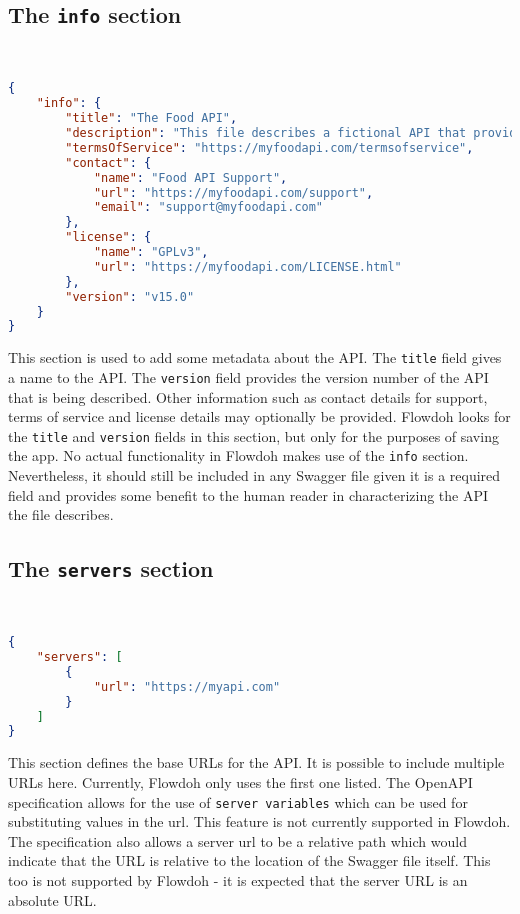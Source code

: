 \subsection{The \texttt{info} section}
\hfill\\
\begin{minipage}{\textwidth}
\begin{lstlisting}[caption={A fully populated \texttt{info} section},label={code:info_section},language=json]
{
    "info": {
        "title": "The Food API",
        "description": "This file describes a fictional API that provides details about food items",
        "termsOfService": "https://myfoodapi.com/termsofservice",
        "contact": {
            "name": "Food API Support",
            "url": "https://myfoodapi.com/support",
            "email": "support@myfoodapi.com"
        },
        "license": {
            "name": "GPLv3",
            "url": "https://myfoodapi.com/LICENSE.html"
        },
        "version": "v15.0"
    }
}
\end{lstlisting}
\end{minipage}
This section is used to add some metadata about the API. The \texttt{title} field gives a name to the API. The \texttt{version} field provides the version number of the API that is being described. Other information such as contact details for support, terms of service and license details may optionally be provided. Flowdoh looks for the \texttt{title} and \texttt{version} fields in this section, but only for the purposes of saving the app. No actual functionality in Flowdoh makes use of the \texttt{info} section. Nevertheless, it should still be included in any Swagger file given it is a required field and provides some benefit to the human reader in characterizing the API the file describes.
\subsection{The \texttt{servers} section}
\hfill\\
\begin{minipage}{\textwidth}
\begin{lstlisting}[caption={A URL defined in the \texttt{servers} section},label={code:servers},language=json]
{
    "servers": [
        {
            "url": "https://myapi.com"
        }
    ]
}
\end{lstlisting}
\end{minipage}
This section defines the base URLs for the API. It is possible to include multiple URLs here. Currently, Flowdoh only uses the first one listed. The OpenAPI specification allows for the use of \texttt{server variables} \cite{servervariables} which can be used for substituting values in the url. This feature is not currently supported in Flowdoh. The specification also allows a server url to be a relative path which would indicate that the URL is relative to the location of the Swagger file itself. This too is not supported by Flowdoh - it is expected that the server URL is an absolute URL.
